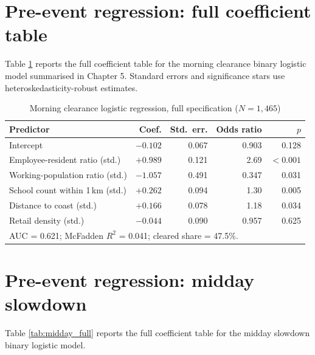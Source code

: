 \documentclass[12pt,a4paper]{report}
\begin{document}
\section{Pre-event regression: full coefficient table}
Table \ref{tab:morning_full} reports the full coefficient table for the morning clearance binary logistic model summarised in Chapter 5. Standard errors and significance stars use heteroskedasticity-robust estimates.

\begin{table}[H]
\centering
\caption{Morning clearance logistic regression, full specification ($N = 1{,}465$)}
\label{tab:morning_full}
\begin{tabular}{lrrrr}
\toprule
Predictor & Coef. & Std.\ err. & Odds ratio & $p$ \\
\midrule
Intercept                       & $-0.102$ & 0.067 & 0.903 & 0.128 \\
Employee-resident ratio (std.)  & $+0.989$ & 0.121 & 2.69  & $< 0.001$ \\
Working-population ratio (std.) & $-1.057$ & 0.491 & 0.347 & 0.031 \\
School count within 1\,km (std.)& $+0.262$ & 0.094 & 1.30  & 0.005 \\
Distance to coast (std.)        & $+0.166$ & 0.078 & 1.18  & 0.034 \\
Retail density (std.)           & $-0.044$ & 0.090 & 0.957 & 0.625 \\
\midrule
\multicolumn{5}{l}{AUC = 0.621; McFadden $R^2$ = 0.041; cleared share = 47.5\%.} \\
\bottomrule
\end{tabular}
\end{table}

\section{Pre-event regression: midday slowdown}
Table \ref{tab:midday_full} reports the full coefficient table for the midday slowdown binary logistic model.
\end{document}
